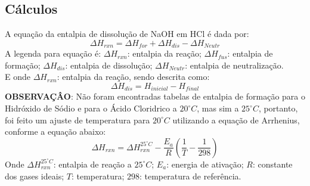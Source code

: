         \subsection{Cálculos}\label{sec:calculos}
            \indent A equação da entalpia de dissolução de NaOH em HCl é dada por:
            \begin{equation}
                \Delta H_{rxn} = \Delta H_{for} + \Delta H_{dis} - \Delta H_{Neutr}\label{eq:equation0}
            \end{equation}
			\indent A legenda para equação é: $\Delta H_{rxn}$: entalpia da reação; $\Delta H_{fus}$: entalpia de formação; $\Delta H_{dis}$: entalpia de dissolução; $\Delta H_{Neutr}$: entalpia de neutralização.\\
			\indent E onde $\Delta H_{rxn}$: entalpia da reação, sendo descrita como:\
			\begin{equation}
				\Delta H_{dis} = H_{inicial} - H_{final}\label{eq:equation1}
            \end{equation}
			\indent \textbf{OBSERVAÇÂO}: Não foram encontradas tabelas de entalpia de formação para o Hidróxido de Sódio e para o Ácido Cloridrico a $20^{\circ}C$, mas sim a
            $25^{\circ}C$, portanto, foi feito um ajuste de temperatura para $20^{\circ}C$ utilizando a equação de Arrhenius, conforme a equação abaixo:
            \begin{equation}
                \Delta H_{rxn} = \Delta H_{rxn}^{25^{\circ}C} - \frac{E_{a}}{R} \left( \frac{1}{T} - \frac{1}{298} \right)\label{eq:equation2}
            \end{equation}
            \indent Onde $\Delta H_{rxn}^{25^{\circ}C}$: entalpia de reação a $25^{\circ}C$; $E_{a}$: energia de ativação; $R$: constante dos gases ideais; $T$: temperatura; $298$: temperatura de referência.\\
            
